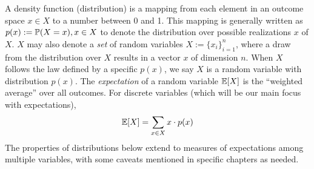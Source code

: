 
A density function (distribution) is a mapping from each element in an outcome space $x \in X$ to a number between 0 and 1.
This mapping is generally written as $p(x):=\mathbb{P}(X=x), x \in X$ to denote the distribution over possible realizations $x$ of $X$.
$X$ may also denote a \textit{set} of random variables $X:=\{x_i\}_{i=1}^n$, where a draw from the distribution over $X$ results in a vector $x$ of dimension $n$. When $X$ follows the law defined by a specific $p(x)$, we say $X$ is a random variable with distribution $p(x)$.
The \textit{expectation} of a random variable $\mathbb{E}[X]$ is the ``weighted average'' over all outcomes. For discrete variables (which will be our main focus with expectations), 
\begin{align}
\mathbb{E}[X] = \sum_{x\in X} x\cdot p(x)
\end{align}
The properties of distributions below extend to measures of expectations among multiple variables, with some caveats mentioned in specific chapters as needed.


